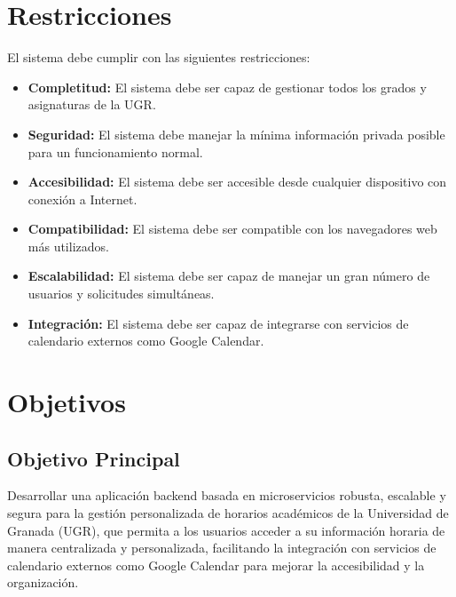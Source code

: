 \section{Restricciones}


El sistema debe cumplir con las siguientes restricciones:

\begin{itemize}
    \item \textbf{Completitud:} El sistema debe ser capaz de gestionar todos los grados y asignaturas de la UGR.
    \item \textbf{Seguridad:} El sistema debe manejar la mínima información privada posible para un funcionamiento normal.
    \item \textbf{Accesibilidad:} El sistema debe ser accesible desde cualquier dispositivo con conexión a Internet.
    \item \textbf{Compatibilidad:} El sistema debe ser compatible con los navegadores web más utilizados.
    \item \textbf{Escalabilidad:} El sistema debe ser capaz de manejar un gran número de usuarios y solicitudes simultáneas.
    \item \textbf{Integración:} El sistema debe ser capaz de integrarse con servicios de calendario externos como Google Calendar.
\end{itemize}

\section{Objetivos}


\subsection{Objetivo Principal}

Desarrollar una aplicación backend basada en microservicios robusta, escalable y segura para la gestión personalizada de horarios académicos de la Universidad de Granada (UGR), que permita a los usuarios acceder a su información horaria de manera centralizada y personalizada, facilitando la integración con servicios de calendario externos como Google Calendar para mejorar la accesibilidad y la organización.

